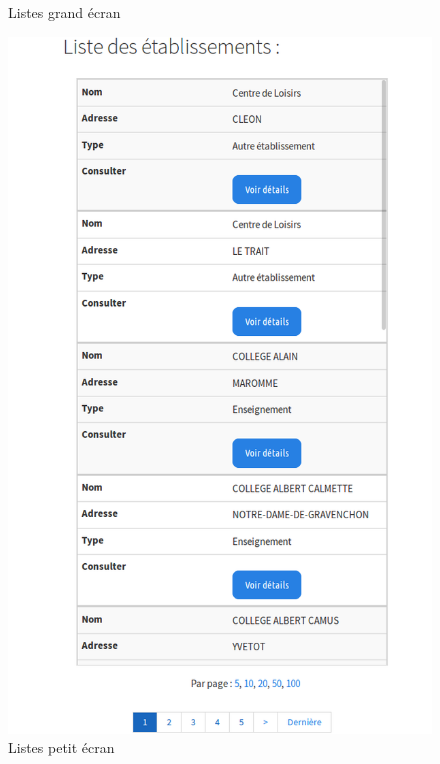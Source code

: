 \begin{frame}
\begin{multicols}{2}
\begin{figure}[!h]
\begin{center}
				\caption{Listes grand écran }
			\end{center}
		\end{figure}
		\begin{figure}[!h]
			\begin{center}
				\includegraphics[scale=0.16]{images/screenshot2.png}
				\caption{Listes petit écran }
			\end{center}
		\end{figure}
	\end{multicols}

\end{frame}

